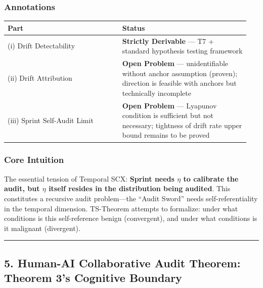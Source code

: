 \documentclass[
  12pt,
]{article}
\begin{document}
\subsubsection{Annotations}\label{ts-annotations}

\begin{longtable}[]{@{}p{0.45\linewidth}p{0.50\linewidth}@{}}
\toprule\noalign{}
\begin{minipage}[b]{\linewidth}\raggedright
Part
\end{minipage} & \begin{minipage}[b]{\linewidth}\raggedright
Status
\end{minipage} \\
\midrule\noalign{}
\endhead
\bottomrule\noalign{}
\endlastfoot
(i) Drift Detectability & \textbf{Strictly Derivable} --- T7 + standard hypothesis testing framework \\
(ii) Drift Attribution & \textbf{Open Problem} --- unidentifiable without anchor assumption (proven); direction is feasible with anchors but technically incomplete \\
(iii) Sprint Self-Audit Limit & \textbf{Open Problem} --- Lyapunov condition is sufficient but not necessary; tightness of drift rate upper bound remains to be proved \\
\end{longtable}

\subsubsection{Core Intuition}\label{core-intuition-ts}

The essential tension of Temporal SCX: \textbf{Sprint needs $\eta$ to calibrate the audit, but $\eta$ itself resides in the distribution being audited}. This constitutes a recursive audit problem---the ``Audit Sword'' needs self-referentiality in the temporal dimension. TS-Theorem attempts to formalize: under what conditions is this self-reference benign (convergent), and under what conditions is it malignant (divergent).

\begin{center}\rule{0.5\linewidth}{0.5pt}\end{center}

\subsection{5. Human-AI Collaborative Audit Theorem: Theorem 3's Cognitive Boundary}\label{human-ai-collaborative-theorem}
\end{document}
